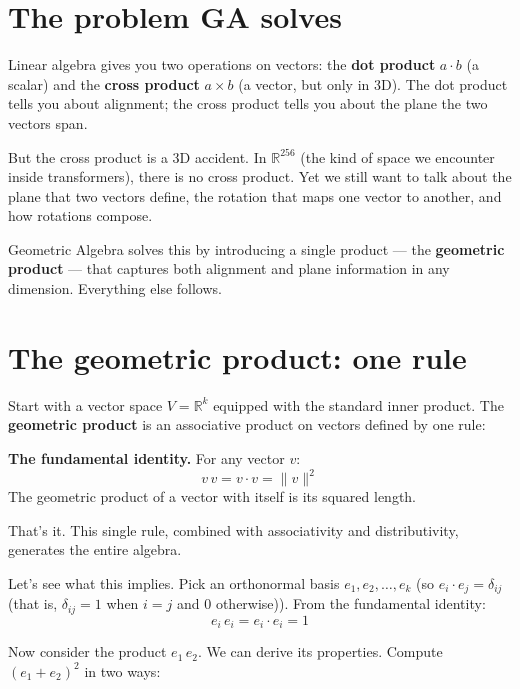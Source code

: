 \documentclass[11pt, twoside, openright]{memoir}
\newcommand{\ip}{\cdot}           %
\numberwithin{equation}{chapter}
\begin{document}
\section{The problem GA solves}

Linear algebra gives you two operations on vectors: the \textbf{dot
product} $a \ip b$ (a scalar) and the \textbf{cross product}
$a \times b$ (a vector, but only in 3D).  The dot product tells you
about alignment; the cross product tells you about the plane the two
vectors span.

But the cross product is a 3D accident.  In $\mathbb{R}^{256}$ (the
kind of space we encounter inside transformers), there is no cross
product.  Yet we still want to talk about the plane that two vectors
define, the rotation that maps one vector to another, and how
rotations compose.

Geometric Algebra solves this by introducing a single product --- the
\textbf{geometric product} --- that captures both alignment and plane
information in any dimension.  Everything else follows.

\section{The geometric product: one rule}

Start with a vector space $V = \mathbb{R}^k$ equipped with the
standard inner product.  The \textbf{geometric product} is an
associative product on vectors defined by one rule:

\begin{gabox}
\textbf{The fundamental identity.}  For any vector $v$:
\begin{equation}
  v \, v = v \ip v = \|v\|^2
\end{equation}
The geometric product of a vector with itself is its squared length.
\end{gabox}

That's it.  This single rule, combined with associativity and
distributivity, generates the entire algebra.

Let's see what this implies.  Pick an orthonormal basis
$e_1, e_2, \ldots, e_k$ (so $e_i \ip e_j = \delta_{ij}$ (that is, $\delta_{ij} = 1$ when $i = j$ and $0$ otherwise)).
From the fundamental identity:
\begin{equation}
  e_i \, e_i = e_i \ip e_i = 1
\end{equation}

Now consider the product $e_1 \, e_2$.  We can derive its properties.
Compute $(e_1 + e_2)^2$ in two ways:
\end{document}
